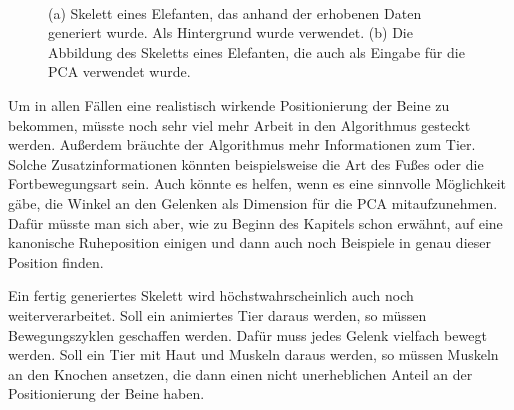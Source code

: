 \begin{figure}
 ~
 
 \caption{(a) Skelett eines Elefanten, das anhand der erhobenen Daten generiert wurde. Als Hintergrund wurde \cite{background} verwendet. (b) Die Abbildung des Skeletts eines Elefanten, die auch als Eingabe für die PCA verwendet wurde.}
 \label{elefant}
\end{figure}


Um in allen Fällen eine realistisch wirkende Positionierung der Beine zu bekommen, müsste noch sehr viel mehr Arbeit in den Algorithmus gesteckt werden. Außerdem bräuchte der Algorithmus mehr Informationen zum Tier. Solche Zusatzinformationen könnten beispielsweise die Art des Fußes oder die Fortbewegungsart sein. Auch könnte es helfen, wenn es eine sinnvolle Möglichkeit gäbe, die Winkel an den Gelenken als Dimension für die PCA mitaufzunehmen. Dafür müsste man sich aber, wie zu Beginn des Kapitels schon erwähnt, auf eine kanonische Ruheposition einigen und dann auch noch Beispiele in genau dieser Position finden.

Ein fertig generiertes Skelett wird höchstwahrscheinlich auch noch weiterverarbeitet. Soll \zb ein animiertes Tier daraus werden, so müssen Bewegungszyklen geschaffen werden. Dafür muss jedes Gelenk vielfach bewegt werden. Soll ein Tier mit Haut und Muskeln daraus werden, so müssen Muskeln an den Knochen ansetzen, die dann einen nicht unerheblichen Anteil an der Positionierung der Beine haben.

